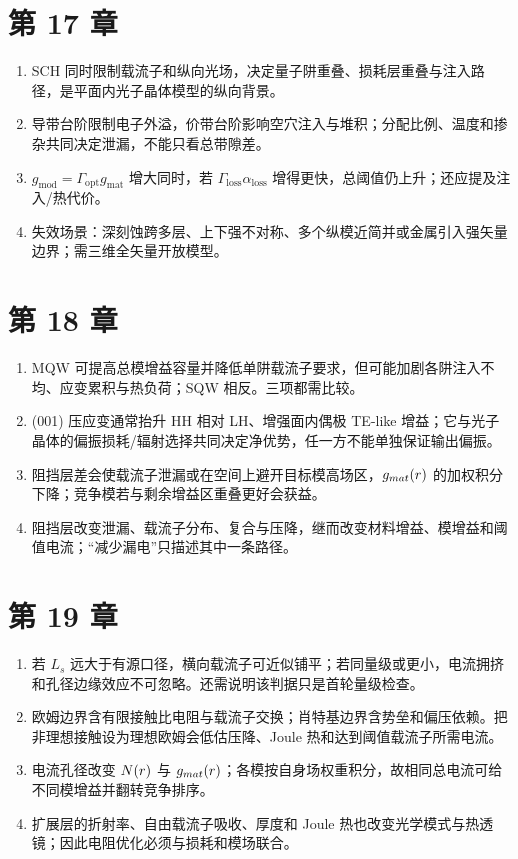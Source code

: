 \section{第 17 章}
\begin{enumerate}
  \item SCH 同时限制载流子和纵向光场，决定量子阱重叠、损耗层重叠与注入路径，是平面内光子晶体模型的纵向背景。
  \item 导带台阶限制电子外溢，价带台阶影响空穴注入与堆积；分配比例、温度和掺杂共同决定泄漏，不能只看总带隙差。
  \item $g_{\mathrm{mod}}=\Gamma_{\mathrm{opt}}g_{\mathrm{mat}}$ 增大同时，若 $\Gamma_{\mathrm{loss}}\alpha_{\mathrm{loss}}$ 增得更快，总阈值仍上升；还应提及注入/热代价。
  \item 失效场景：深刻蚀跨多层、上下强不对称、多个纵模近简并或金属引入强矢量边界；需三维全矢量开放模型。
\end{enumerate}

\section{第 18 章}
\begin{enumerate}
  \item MQW 可提高总模增益容量并降低单阱载流子要求，但可能加剧各阱注入不均、应变累积与热负荷；SQW 相反。三项都需比较。
  \item (001) 压应变通常抬升 HH 相对 LH、增强面内偶极 TE-like 增益；它与光子晶体的偏振损耗/辐射选择共同决定净优势，任一方不能单独保证输出偏振。
  \item 阻挡层差会使载流子泄漏或在空间上避开目标模高场区，$g_{mat}(r)$ 的加权积分下降；竞争模若与剩余增益区重叠更好会获益。
  \item 阻挡层改变泄漏、载流子分布、复合与压降，继而改变材料增益、模增益和阈值电流；“减少漏电”只描述其中一条路径。
\end{enumerate}

\section{第 19 章}
\begin{enumerate}
  \item 若 $L_s$ 远大于有源口径，横向载流子可近似铺平；若同量级或更小，电流拥挤和孔径边缘效应不可忽略。还需说明该判据只是首轮量级检查。
  \item 欧姆边界含有限接触比电阻与载流子交换；肖特基边界含势垒和偏压依赖。把非理想接触设为理想欧姆会低估压降、Joule 热和达到阈值载流子所需电流。
  \item 电流孔径改变 $N(r)$ 与 $g_{mat}(r)$；各模按自身场权重积分，故相同总电流可给不同模增益并翻转竞争排序。
  \item 扩展层的折射率、自由载流子吸收、厚度和 Joule 热也改变光学模式与热透镜；因此电阻优化必须与损耗和模场联合。
\end{enumerate}


